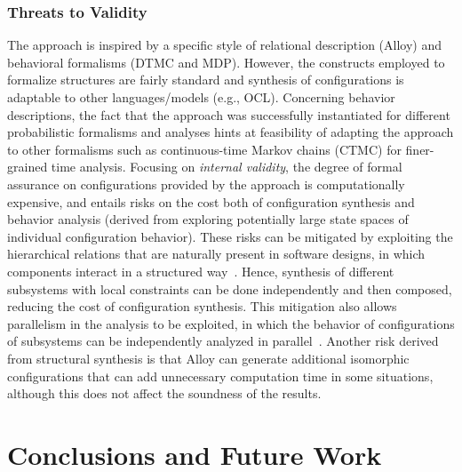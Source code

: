 \documentclass[10pt,journal,compsoc]{IEEEtran}
\begin{document}
\subsubsection{Threats to Validity}
\label{sec:threats} The approach is inspired by a specific style of relational description (Alloy) and behavioral formalisms (DTMC and MDP).
However, the constructs employed to formalize structures are fairly standard and synthesis of configurations is adaptable to other languages/models (e.g., OCL).
Concerning behavior descriptions, the fact that the approach was successfully instantiated for different probabilistic formalisms and analyses hints at feasibility of adapting the approach to other formalisms such as continuous-time Markov chains (CTMC) for finer-grained time analysis.
Focusing on {\em internal validity}, the degree of formal assurance on configurations provided by the approach is computationally expensive, and entails risks on the cost both of configuration synthesis and behavior analysis (derived from exploring potentially large state spaces of individual configuration behavior). 
These risks can be mitigated by exploiting the hierarchical relations that are naturally present in software designs, in which components interact in a structured way~\cite{DBLP:conf/sigsoft/KangMJ16}. Hence, synthesis of different subsystems with local constraints can be done independently and then composed, reducing the cost of configuration synthesis. 
This mitigation also allows parallelism in the analysis to be exploited, in which the behavior of configurations of subsystems can be independently analyzed in parallel~\cite{Johnson:2013:IVF:2465449.2465456}.  
Another risk derived from structural synthesis is that Alloy can generate additional isomorphic configurations that can add unnecessary computation time in some situations, although this does not affect the soundness of the results.



\section{Conclusions and Future Work}
\label{sec:conclusion}
\end{document}

